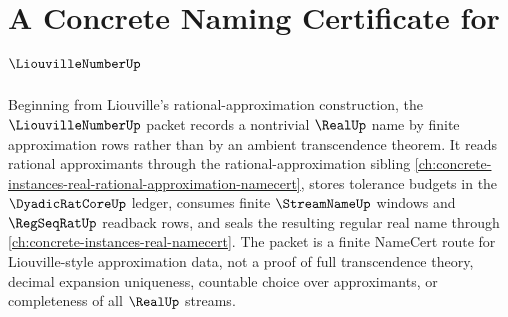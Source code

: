 \chapter{A Concrete Naming Certificate for $\LiouvilleNumberUp$}
\label{ch:concrete-instances-liouville-number-namecert}

Beginning from Liouville's rational-approximation construction, the $\LiouvilleNumberUp$ packet records a nontrivial $\RealUp$ name by finite approximation rows rather than by an ambient transcendence theorem. It reads rational approximants through the rational-approximation sibling \autoref{ch:concrete-instances-real-rational-approximation-namecert}, stores tolerance budgets in the $\DyadicRatCoreUp$ ledger, consumes finite $\StreamNameUp$ windows and $\RegSeqRatUp$ readback rows, and seals the resulting regular real name through \autoref{ch:concrete-instances-real-namecert}. The packet is a finite NameCert route for Liouville-style approximation data, not a proof of full transcendence theory, decimal expansion uniqueness, countable choice over approximants, or completeness of all $\RealUp$ streams.

